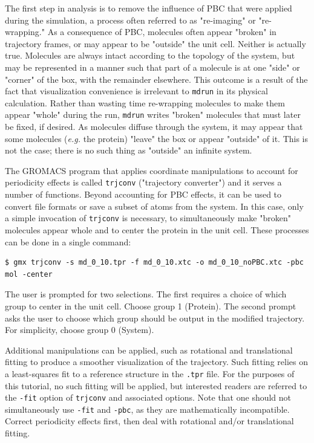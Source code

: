 \documentclass[9pt,tutorial,pubversion]{livecoms}
\begin{document}
The first step in analysis is to remove the influence of PBC that were applied during the simulation, a process often referred to as "re-imaging" or "re-wrapping." As a consequence of PBC, molecules often appear "broken" in trajectory frames, or may appear to be "outside" the unit cell. Neither is actually true. Molecules are always intact according to the topology of the system, but may be represented in a manner such that part of a molecule is at one "side" or "corner" of the box, with the remainder elsewhere. This outcome is a result of the fact that visualization convenience is irrelevant to \texttt{mdrun} in its physical calculation. Rather than wasting time re-wrapping molecules to make them appear "whole" during the run, \texttt{mdrun} writes "broken" molecules that must later be fixed, if desired. As molecules diffuse through the system, it may appear that some molecules ({\em e.g.} the protein) "leave" the box or appear "outside" of it. This is not the case; there is no such thing as "outside" an infinite system.

The GROMACS program that applies coordinate manipulations to account for periodicity effects is called \texttt{trjconv} ("trajectory converter") and it serves a number of functions. Beyond accounting for PBC effects, it can be used to convert file formats or save a subset of atoms from the system. In this case, only a simple invocation of \texttt{trjconv} is necessary, to simultaneously make "broken" molecules appear whole and to center the protein in the unit cell. These processes can be done in a single command:

\begin{lstlisting}
$ gmx trjconv -s md_0_10.tpr -f md_0_10.xtc -o md_0_10_noPBC.xtc -pbc mol -center
\end{lstlisting}
%
The user is prompted for two selections. The first requires a choice of which group to center in the unit cell. Choose group 1 (Protein). The second prompt asks the user to choose which group should be output in the modified trajectory. For simplicity, choose group 0 (System).

Additional manipulations can be applied, such as rotational and translational fitting to produce a smoother visualization of the trajectory. Such fitting relies on a least-squares fit to a reference structure in the \texttt{.tpr} file. For the purposes of this tutorial, no such fitting will be applied, but interested readers are referred to the \texttt{-fit} option of \texttt{trjconv} and associated options. Note that one should not simultaneously use \texttt{-fit} and \texttt{-pbc}, as they are mathematically incompatible. Correct periodicity effects first, then deal with rotational and/or translational fitting.
\end{document}
